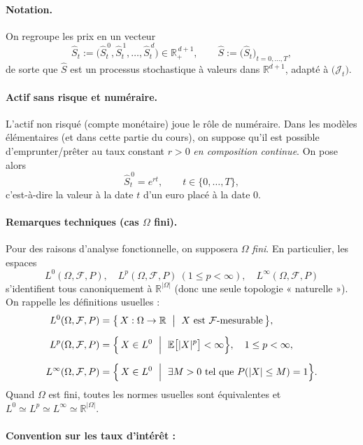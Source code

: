 \documentclass[12pt,a4paper]{article}
\numberwithin{equation}{section}
\theoremstyle{plain} %
\theoremstyle{definition} %
\theoremstyle{remark} %
\theoremstyle{myexample}
\theoremstyle{definition}
\newcommand{\E}{\mathbb{E}}
\newcommand{\RR}{\mathbb{R}}
\begin{document}
\paragraph{Notation.}
On regroupe les prix en un vecteur
\[
\hat S_t:=\big(\hat S_t^{\,0},\hat S_t^{\,1},\dots,\hat S_t^{\,d}\big)\in\RR_+^{\,d+1},
\qquad
\hat S:=\big(\hat S_t\big)_{t=0,\dots,T},
\]
de sorte que $\hat S$ est un processus stochastique à valeurs dans $\RR^{d+1}$, adapté à
$\big(\mathcal{J}_t\big)$.

\paragraph{Actif sans risque et numéraire.}
L’actif non risqué (compte monétaire) joue le rôle de numéraire. Dans les modèles élémentaires
(et dans cette partie du cours), on suppose qu’il est possible d’emprunter/prêter au taux
constant $r>0$ \emph{en composition continue}. On pose alors
\[
\hat S_t^{\,0}=e^{rt},\qquad t\in\{0,\dots,T\},
\]
c’est-à-dire la valeur à la date $t$ d’un euro placé à la date $0$.

\bigskip
\paragraph{Remarques techniques (cas $\Omega$ fini).}
Pour des raisons d’analyse fonctionnelle, on supposera $\Omega$ \emph{fini}. En particulier,
les espaces
\[
L^0(\Omega,\mathcal{F},P),\quad L^p(\Omega,\mathcal{F},P)\ (1\le p<\infty),\quad
L^\infty(\Omega,\mathcal{F},P)
\]
s’identifient tous canoniquement à $\RR^{|\Omega|}$ (donc une seule topologie « naturelle »).
On rappelle les définitions usuelles :
\[
\begin{aligned}
L^0(\Omega,\mathcal{F},P)
&=\bigl\{\,X:\Omega\to\RR\ \bigm|\ X\ \text{est }\mathcal{F}\text{-mesurable}\,\bigr\},\\[2mm]
L^p(\Omega,\mathcal{F},P)
&=\Bigl\{\,X\in L^0\ \Bigm|\ \E\bigl[|X|^p\bigr]<\infty\Bigr\},
\quad 1\le p<\infty,\\[2mm]
L^\infty(\Omega,\mathcal{F},P)
&=\Bigl\{\,X\in L^0\ \Bigm|\ \exists M>0\ \text{tel que }P(|X|\le M)=1\Bigr\}.
\end{aligned}
\]
Quand $\Omega$ est fini, toutes les normes usuelles sont équivalentes et
\(
L^0\simeq L^p\simeq L^\infty\simeq \RR^{|\Omega|}.
\)


\paragraph{Convention sur les taux d’intérêt :}
\end{document}
